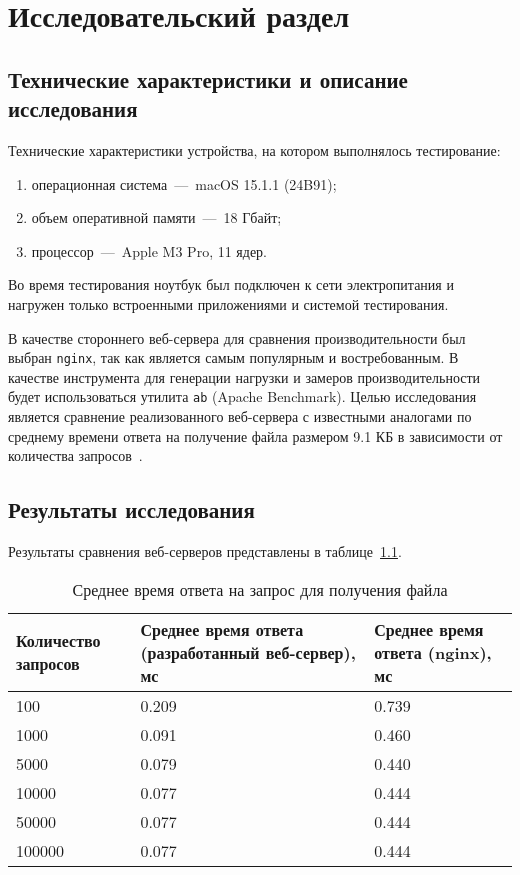 \chapter{Исследовательский раздел}

\section{Технические характеристики и описание исследования}

Технические характеристики устройства, на котором выполнялось тестирование:
\begin{enumerate}
	\item операционная система~---~macOS 15.1.1 (24B91); 
	\item объем оперативной памяти~---~18 Гбайт;
	\item процессор~---~Apple M3 Pro, 11 ядер.
\end{enumerate}

Во время тестирования ноутбук был подключен к сети электропитания и нагружен только встроенными приложениями и системой тестирования.

В качестве стороннего веб-сервера для сравнения производительности был выбран \texttt{nginx}, так как является самым популярным и востребованным.
В качестве инструмента для генерации нагрузки и замеров производительности будет использоваться утилита \texttt{ab} (Apache Benchmark).
Целью исследования является сравнение реализованного веб-сервера с известными аналогами по среднему времени ответа на получение файла размером 9.1 КБ в зависимости от количества запросов~\cite{nginx, ab}.

\clearpage
\section{Результаты исследования}

Результаты сравнения веб-серверов представлены в таблице~\ref{table1}.
\begin{table}[!ht]
	\centering
	\caption{Среднее время ответа на запрос для получения файла}
	\label{table1}
	\begin{tabularx}{\textwidth}{|X|X|X|}
		\hline
		Количество запросов & Среднее время ответа (разработанный веб-сервер), мс & Среднее время ответа (nginx), мс \\ \hline
		100 & 0.209 & 0.739 \\ \hline
		1000 & 0.091 & 0.460 \\ \hline
		5000 & 0.079 & 0.440 \\ \hline
		10000 & 0.077 & 0.444 \\ \hline
		50000 & 0.077 & 0.444 \\ \hline
		100000 & 0.077 & 0.444 \\ \hline
	\end{tabularx}
\end{table}

